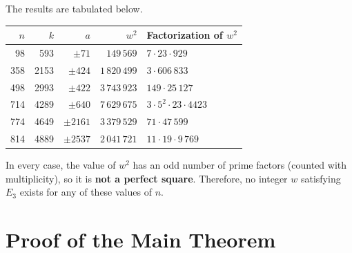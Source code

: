 \documentclass[12pt]{article}
\begin{document}
The results are tabulated below.

\begin{center}
\begin{tabular}{r|r|r|r|l}
$n$ & $k$ & $a$ & $w^2$ & Factorization of $w^2$ \\
\hline
 98  &  593  & $\pm 71$   & $149\,569$   & $7 \cdot 23 \cdot 929$ \\
358  & 2153  & $\pm 424$  & $1\,820\,499$  & $3 \cdot 606\,833$ \\
498  & 2993  & $\pm 422$  & $3\,743\,923$  & $149 \cdot 25\,127$ \\
714  & 4289  & $\pm 640$  & $7\,629\,675$  & $3 \cdot 5^2 \cdot 23 \cdot 4423$ \\
774  & 4649  & $\pm 2161$ & $3\,379\,529$  & $71 \cdot 47\,599$ \\
814  & 4889  & $\pm 2537$ & $2\,041\,721$  & $11 \cdot 19 \cdot 9\,769$ \\
\end{tabular}
\end{center}

In every case, the value of $w^2$ has an odd number of prime factors (counted with multiplicity),
so it is \textbf{not a perfect square}. Therefore, no integer $w$ satisfying $E_3$ exists 
for any of these values of $n$.

\section{Proof of the Main Theorem}
\end{document}
